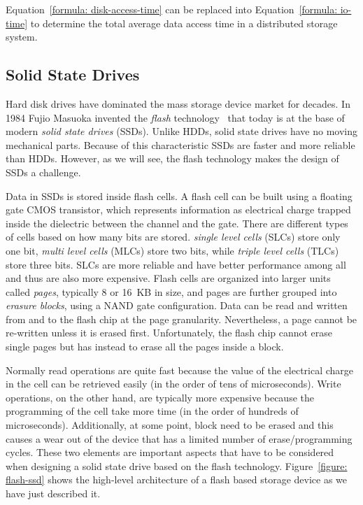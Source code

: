 Equation~\ref{formula: disk-access-time} can be replaced into Equation~\ref{formula: io-time} to determine the total average data access time in a distributed storage system.

\subsection{Solid State Drives}
Hard disk drives have dominated the mass storage device market for decades. In 1984 Fujio Masuoka invented the \textit{flash} technology~\cite{Masuoka1984} that today is at the base of modern \textit{solid state drives} (SSDs). Unlike HDDs, 
solid state drives have no moving mechanical parts. Because of this characteristic SSDs are faster and more reliable than HDDs. However, as we will see, the flash technology makes the design of SSDs a challenge.

Data in SSDs is stored inside flash cells. A flash cell can be built using a floating gate CMOS transistor, which represents information as electrical charge trapped inside the dielectric between the channel and the gate. There are 
different types of cells based on how many bits are stored. \textit{single level cells} (SLCs) store only one bit, \textit{multi level cells} (MLCs) store two bits, while \textit{triple level cells} (TLCs) store three bits. 
SLCs are more reliable and have better performance among all and thus are also more expensive. Flash cells are organized into larger units called \textit{pages}, typically 8 or 16~KB in size, and pages are further grouped 
into \textit{erasure blocks}, using a NAND gate configuration. Data can be read and written from and to the flash chip at the page granularity. Nevertheless, a page cannot be re-written unless it is erased first. Unfortunately, 
the flash chip cannot erase single pages but has instead to erase all the pages inside a block. %

Normally read operations are quite fast because the value of the electrical charge in the cell can be retrieved easily (in the order of tens of microseconds). Write operations, on the other hand, are typically more expensive
because the programming of the cell take more time (in the order of hundreds of microseconds). Additionally, at some point, block need to be erased and this causes a wear out of the device that has a limited number of
erase/programming cycles. These two elements are important aspects that have to be considered when designing a solid state drive based on the flash technology. Figure~\ref{figure: flash-ssd} shows the high-level architecture
of a flash based storage device as we have just described it.

